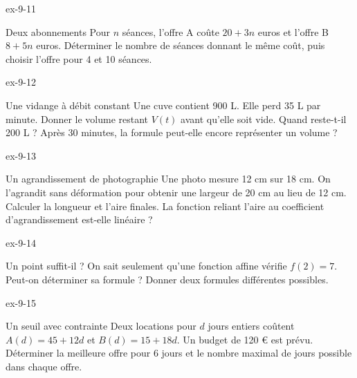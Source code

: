 \clearpage{}
\begin{blocLivre}{ex-9-11}\begin{exercice}[3]{Deux abonnements}
Pour $n$ séances, l’offre A coûte $20+3n$ euros et l’offre B $8+5n$ euros. Déterminer le nombre de séances donnant le même coût, puis choisir l’offre pour 4 et 10 séances.
\label{fig-ex-9-11}
\end{exercice}\end{blocLivre}
\begin{blocLivre}{ex-9-12}\begin{exercice}[3]{Une vidange à débit constant}
Une cuve contient 900 L. Elle perd 35 L par minute. Donner le volume restant $V(t)$ avant qu’elle soit vide. Quand reste-t-il 200 L ? Après 30 minutes, la formule peut-elle encore représenter un volume ?
\end{exercice}\end{blocLivre}
\begin{blocLivre}{ex-9-13}\begin{exercice}[3]{Un agrandissement de photographie}
Une photo mesure 12 cm sur 18 cm. On l’agrandit sans déformation pour obtenir une largeur de 20 cm au lieu de 12 cm. Calculer la longueur et l’aire finales. La fonction reliant l’aire au coefficient d’agrandissement est-elle linéaire ?
\end{exercice}\end{blocLivre}
\begin{blocLivre}{ex-9-14}\begin{exercice}[3]{Un point suffit-il ?}
On sait seulement qu’une fonction affine vérifie $f(2)=7$. Peut-on déterminer sa formule ? Donner deux formules différentes possibles.
\end{exercice}\end{blocLivre}
\begin{blocLivre}{ex-9-15}\begin{exercice}[3]{Un seuil avec contrainte}
Deux locations pour $d$ jours entiers coûtent $A(d)=45+12d$ et $B(d)=15+18d$. Un budget de 120 € est prévu. Déterminer la meilleure offre pour 6 jours et le nombre maximal de jours possible dans chaque offre.
\end{exercice}\end{blocLivre}

\clearpage
